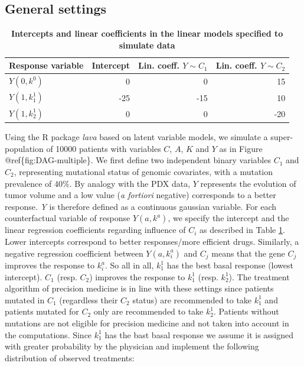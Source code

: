 \documentclass[a4paper,12pt,twoside,onecolumn,openright,final,oldfontcommands]{memoir}
\begin{document}
\subsection{General settings}\label{general-settings}

\begin{table}

\caption{\label{tab:simparam}\textbf{Intercepts and linear coefficients in the
linear models specified to simulate data}}
\centering
\begin{tabular}[t]{l|r|r|r}
\hline
Response variable & Intercept & Lin. coeff. $Y \sim C_1$ & Lin. coeff. $Y \sim C_2$\\
\hline
$Y(0,k^0)$ & 0 & 0 & 15\\
\hline
$Y(1,k^1_1)$ & -25 & -15 & 10\\
\hline
$Y(1,k^1_2)$ & 0 & 0 & -20\\
\hline
\end{tabular}
\end{table}




Using the R package \emph{lava} based on latent variable models, we
simulate a super-population of 10000 patients with variables \(C\),
\(A\), \(K\) and \(Y\) as in Figure @ref\{fig:DAG-multiple\}. We first
define two independent binary variables \(C_1\) and \(C_2\),
representing mutational status of genomic covariates, with a mutation
prevalence of 40\%. By analogy with the PDX data, \(Y\) represents the
evolution of tumor volume and a low value (\emph{a fortiori} negative)
corresponds to a better response. \emph{Y} is therefore defined as a
continuous gaussian variable. For each counterfactual variable of
response \(Y(a, k^a)\), we specify the intercept and the linear
regression coefficients regarding influence of \(C_i\) as described in
Table \ref{tab:simparam}. Lower intercepts correspond to better
responses/more efficient drugs. Similarly, a negative regression
coefficient between \(Y(a, k^a_i)\) and \(C_j\) means that the gene
\(C_j\) improves the response to \(k^a_i\). So all in all, \(k^1_1\) has
the best basal response (lowest intercept). \(C_1\) (resp. \(C_2\))
improves the response to \(k^1_1\) (resp. \(k^1_2\)). The treatment
algorithm of precision medicine is in line with these settings since
patients mutated in \(C_1\) (regardless their \(C_2\) status) are
recommended to take \(k^1_1\) and patients mutated for \(C_2\) only are
recommended to take \(k^1_2\). Patients without mutations are not
eligible for precision medicine and not taken into account in the
computations. Since \(k^1_1\) has the bast basal response we assume it
is assigned with greater probability by the physician and implement the
following distribution of observed treatments:
\end{document}

